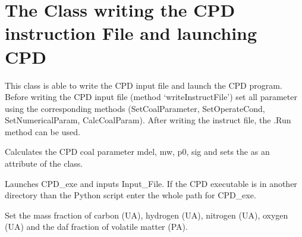 \documentclass[letterpaper,10pt,english]{sphinxmanual}
\begin{document}
\section{The Class writing the CPD instruction File and launching CPD}
\label{CPDClasses:ss-readgen}\label{CPDClasses:the-class-writing-the-cpd-instruction-file-and-launching-cpd}\label{CPDClasses:my-reference-label}

\begin{fulllineitems}
\label{CPDClasses:CPD_SetAndLaunch.SetterAndLauncher}
This class is able to write the CPD input file and launch the CPD program. Before writing the CPD input file (method `writeInstructFile') set all parameter using the corresponding methods (SetCoalParameter, SetOperateCond, SetNumericalParam, CalcCoalParam). After writing the instruct file, the .Run method can be used.

\begin{fulllineitems}
\label{CPDClasses:CPD_SetAndLaunch.SetterAndLauncher.CalcCoalParam}
Calculates the CPD coal parameter mdel, mw, p0, sig and sets the as an attribute of the class.

\end{fulllineitems}


\begin{fulllineitems}
\label{CPDClasses:CPD_SetAndLaunch.SetterAndLauncher.Run}
Launches CPD\_exe and inputs Input\_File. If the CPD executable is in another directory than the Python script enter the whole path for CPD\_exe.

\end{fulllineitems}


\begin{fulllineitems}
\label{CPDClasses:CPD_SetAndLaunch.SetterAndLauncher.SetCoalParameter}
Set the mass fraction of carbon (UA), hydrogen  (UA), nitrogen (UA), oxygen (UA) and the daf fraction of volatile matter (PA).


\end{fulllineitems}
\end{fulllineitems}
\end{document}
